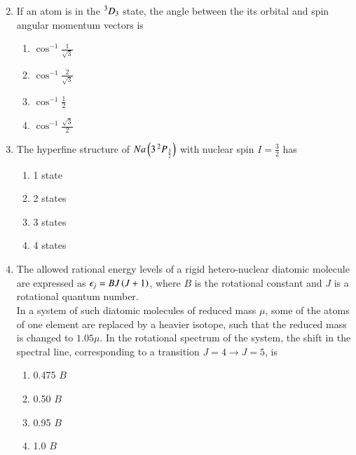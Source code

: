 \documentclass[journal]{IEEEtran}
\begin{document}
\begin{enumerate}
\begin{multicols}{2}
\begin{enumerate}
    \end{enumerate}
\end{multicols}
\item If an atom is in the $\prescript{3}{}{D}_3$ state, the angle between the its orbital and spin angular momentum vectors  is 
\begin{multicols}{4}
    \begin{enumerate}
        \item $\cos^{-1}\frac{1}{\sqrt{3}}$
        \item $\cos^{-1}\frac{2}{\sqrt{3}}$
        \item $\cos^{-1}\frac{1}{2}$
        \item $\cos^{-1}\frac{\sqrt{3}}{2}$
    \end{enumerate}
\end{multicols}
\item  The hyperfine structure of $Na\left(3\prescript{2}{}{P}_\frac{3}{2}\right)$ with nuclear spin $I=\frac{3}{2}$ has 
\begin{multicols}{4}
   \begin{enumerate}
       \item 1 state 
       \item 2 states
       \item 3 states
       \item 4 states
   \end{enumerate}
\end{multicols}
\item The allowed rational energy levels of a rigid hetero-nuclear diatomic molecule are expressed as $\epsilon_j=BJ\left(J+1\right)$, where $B$ is the rotational constant and $J$ is a rotational quantum number.\\ In a system of such diatomic molecules of reduced  mass $\mu$, some of the atoms of one element are replaced by a heavier isotope, such that the reduced mass is changed to $1.05\mu$. In the rotational spectrum of the system, the shift in the spectral line, corresponding to a transition $J=4 \rightarrow J=5$, is 
\begin{multicols}{4}
    \begin{enumerate}
        \item 0.475 $B$
        \item 0.50 $B$
        \item 0.95 $B$
        \item 1.0 $B$
    \end{enumerate}
\end{multicols}

\end{enumerate}
\end{document}
